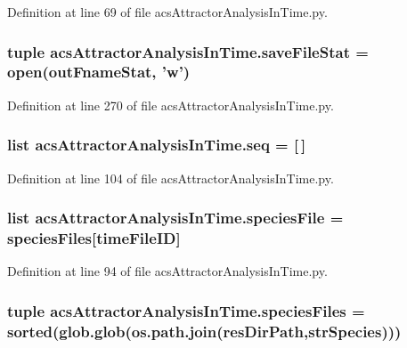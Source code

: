 Definition at line 69 of file acs\-Attractor\-Analysis\-In\-Time.\-py.

\hypertarget{a00092_a372b8cd0e4d3200958e9c61e3a276fb1}{
\subsubsection[{save\-File\-Stat}]{\setlength{\rightskip}{0pt plus 5cm}tuple acs\-Attractor\-Analysis\-In\-Time.\-save\-File\-Stat = open({\bf out\-Fname\-Stat}, 'w')}}\label{a00092_a372b8cd0e4d3200958e9c61e3a276fb1}


Definition at line 270 of file acs\-Attractor\-Analysis\-In\-Time.\-py.

\hypertarget{a00092_a1bdf98839177836f238806755e46ac3c}{
\subsubsection[{seq}]{\setlength{\rightskip}{0pt plus 5cm}list acs\-Attractor\-Analysis\-In\-Time.\-seq = \mbox{[}$\,$\mbox{]}}}\label{a00092_a1bdf98839177836f238806755e46ac3c}


Definition at line 104 of file acs\-Attractor\-Analysis\-In\-Time.\-py.

\hypertarget{a00092_a3c620554bbf7ae30d97a60565fea8d1e}{
\subsubsection[{species\-File}]{\setlength{\rightskip}{0pt plus 5cm}list acs\-Attractor\-Analysis\-In\-Time.\-species\-File = {\bf species\-Files}\mbox{[}time\-File\-I\-D\mbox{]}}}\label{a00092_a3c620554bbf7ae30d97a60565fea8d1e}


Definition at line 94 of file acs\-Attractor\-Analysis\-In\-Time.\-py.

\hypertarget{a00092_a18645475f8596346ca431e99661b5674}{
\subsubsection[{species\-Files}]{\setlength{\rightskip}{0pt plus 5cm}tuple acs\-Attractor\-Analysis\-In\-Time.\-species\-Files = sorted(glob.\-glob(os.\-path.\-join({\bf res\-Dir\-Path},{\bf str\-Species})))}}\label{a00092_a18645475f8596346ca431e99661b5674}


